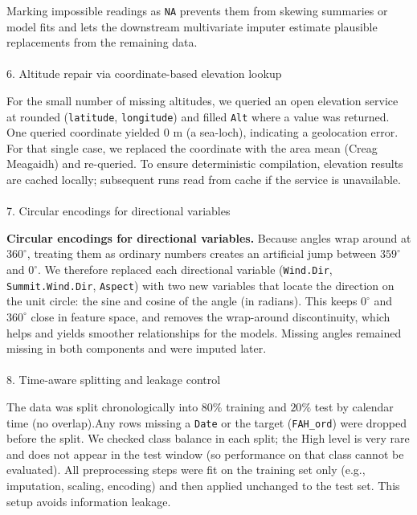 \documentclass[
  letterpaper,
  DIV=11,
  numbers=noendperiod]{scrartcl}
\makeatletter
\let\oldparagraph\paragraph
\renewcommand{\paragraph}{
    \@ifstar
      \xxxParagraphStar
      \xxxParagraphNoStar
  }
\newcommand{\xxxParagraphStar}[1]{\oldparagraph*{#1}\mbox{}}
\newcommand{\xxxParagraphNoStar}[1]{\oldparagraph{#1}\mbox{}}
\makeatother
\begin{document}
Marking impossible readings as \texttt{NA} prevents them from skewing
summaries or model fits and lets the downstream multivariate imputer
estimate plausible replacements from the remaining data.

\paragraph{6. Altitude repair via coordinate-based elevation
lookup}\label{altitude-repair-via-coordinate-based-elevation-lookup}

For the small number of missing altitudes, we queried an open elevation
service at rounded (\texttt{latitude}, \texttt{longitude}) and filled
\texttt{Alt} where a value was returned. One queried coordinate yielded
\(0\) m (a sea-loch), indicating a geolocation error. For that single
case, we replaced the coordinate with the area mean (Creag Meagaidh) and
re-queried. To ensure deterministic compilation, elevation results are
cached locally; subsequent runs read from cache if the service is
unavailable.

\paragraph{7. Circular encodings for directional
variables}\label{circular-encodings-for-directional-variables}

\textbf{Circular encodings for directional variables.} Because angles
wrap around at \(360^\circ\), treating them as ordinary numbers creates
an artificial jump between \(359^\circ\) and \(0^\circ\). We therefore
replaced each directional variable (\texttt{Wind.Dir},
\texttt{Summit.Wind.Dir}, \texttt{Aspect}) with two new variables that
locate the direction on the unit circle: the sine and cosine of the
angle (in radians). This keeps \(0^\circ\) and \(360^\circ\) close in
feature space, and removes the wrap-around discontinuity, which helps
and yields smoother relationships for the models. Missing angles
remained missing in both components and were imputed later.

\paragraph{8. Time-aware splitting and leakage
control}\label{time-aware-splitting-and-leakage-control}

The data was split chronologically into \(80\%\) training and \(20\%\)
test by calendar time (no overlap).Any rows missing a \texttt{Date} or
the target (\texttt{FAH\_ord}) were dropped before the split. We checked
class balance in each split; the High level is very rare and does not
appear in the test window (so performance on that class cannot be
evaluated). All preprocessing steps were fit on the training set only
(e.g., imputation, scaling, encoding) and then applied unchanged to the
test set. This setup avoids information leakage.
\end{document}
